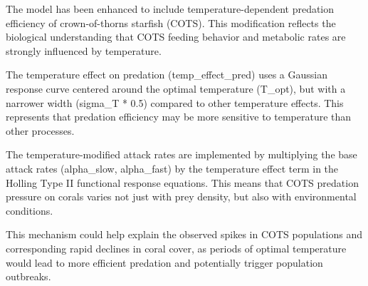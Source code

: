 The model has been enhanced to include temperature-dependent predation efficiency of crown-of-thorns starfish (COTS). This modification reflects the biological understanding that COTS feeding behavior and metabolic rates are strongly influenced by temperature.

The temperature effect on predation (temp_effect_pred) uses a Gaussian response curve centered around the optimal temperature (T_opt), but with a narrower width (sigma_T * 0.5) compared to other temperature effects. This represents that predation efficiency may be more sensitive to temperature than other processes.

The temperature-modified attack rates are implemented by multiplying the base attack rates (alpha_slow, alpha_fast) by the temperature effect term in the Holling Type II functional response equations. This means that COTS predation pressure on corals varies not just with prey density, but also with environmental conditions.

This mechanism could help explain the observed spikes in COTS populations and corresponding rapid declines in coral cover, as periods of optimal temperature would lead to more efficient predation and potentially trigger population outbreaks.
